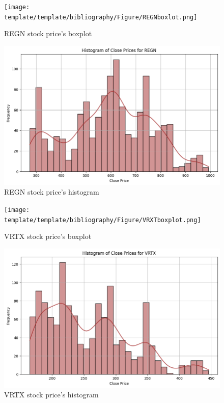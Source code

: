 \documentclass{ieeeojies}
\begin{document}
\begin{figure}[H]
    \centering
    \begin{minipage}{0.23\textwidth}
    \centering
    \texttt{[image: template/template/bibliography/Figure/REGNboxlot.png]}
    \caption{REGN stock price's boxplot}
    \label{fig:1}
    \end{minipage}
    \hfill
    \begin{minipage}{0.23\textwidth}
    \centering
    \includegraphics[width=1\textwidth]{bibliography/Figure/REGNhist.png}
    \caption{REGN stock price's histogram}
    \label{fig:2}
    \end{minipage}
\end{figure}

\begin{figure}[H]
    \centering
    \begin{minipage}{0.23\textwidth}
    \centering
    \texttt{[image: template/template/bibliography/Figure/VRXTboxplot.png]}
    \caption{VRTX stock price's boxplot}
    \label{fig:1}
    \end{minipage}
    \hfill
    \begin{minipage}{0.23\textwidth}
    \centering
    \includegraphics[width=1\textwidth]{bibliography/Figure/VRTXhist.png}
    \caption{VRTX stock price's histogram}
    \label{fig:2}
    \end{minipage}
\end{figure}
\end{document}
